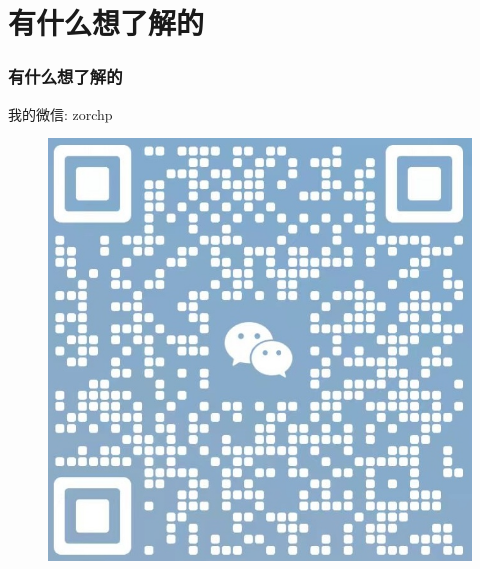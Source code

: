 \documentclass{ctexbeamer}
\begin{document}



\section{有什么想了解的}

\begin{frame}
	\frametitle{有什么想了解的}

	我的微信: zorchp
	\begin{figure}\centering
		\includegraphics[width=.5\textwidth]{figures/my.jpg}
	\end{figure}
\end{frame}

\begin{frame}{}
	\begin{center}
	\end{center}
\end{frame}
\end{document}
